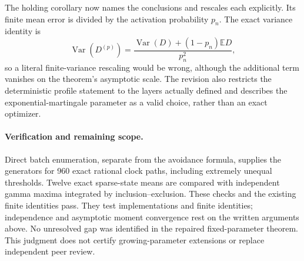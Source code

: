 \documentclass[11pt]{article}
\newcommand{\Ebb}{\mathbb E}
\begin{document}
The holding corollary now names the conclusions and rescales each explicitly.
Its finite mean error is divided by the activation probability $p_n$.
The exact variance identity is
\[
 \operatorname{Var}(D^{(p)})=
 \frac{\operatorname{Var}(D)+(1-p_n)\Ebb D}{p_n^2},
\]
so a literal finite-variance rescaling would be wrong, although the additional
term vanishes on the theorem's asymptotic scale. The revision also restricts
the deterministic profile statement to the layers actually defined and
describes the exponential-martingale parameter as a valid choice, rather
than an exact optimizer.

\paragraph{Verification and remaining scope.}
Direct batch enumeration, separate from the avoidance formula, supplies the
generators for 960 exact rational clock paths, including extremely unequal
thresholds. Twelve exact sparse-state means are compared with independent
gamma maxima integrated by inclusion--exclusion. These checks and the
existing finite identities pass. They test implementations and finite
identities; independence and asymptotic moment convergence rest on the
written arguments above. No unresolved gap was identified in the repaired
fixed-parameter theorem. This judgment does not certify growing-parameter
extensions or replace independent peer review.
\end{document}
